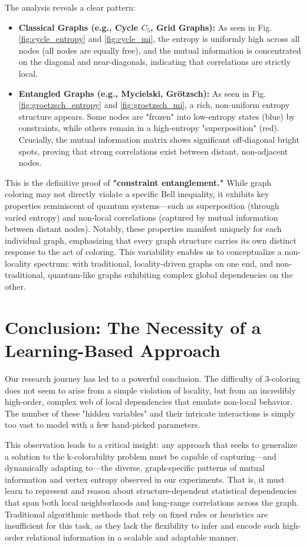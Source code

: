\documentclass[12pt, letterpaper]{article}
\begin{document}
The analysis reveals a clear pattern:
\begin{itemize}
    \item \textbf{Classical Graphs (e.g., Cycle $C_5$, Grid Graphs):} As seen in Fig. \ref{fig:cycle_entropy} and \ref{fig:cycle_mi}, the entropy is uniformly high across all nodes (all nodes are equally free), and the mutual information is concentrated on the diagonal and near-diagonals, indicating that correlations are strictly local.
    \item \textbf{Entangled Graphs (e.g., Mycielski, Grötzsch):} As seen in Fig. \ref{fig:groetzsch_entropy} and \ref{fig:groetzsch_mi}, a rich, non-uniform entropy structure appears. Some nodes are "frozen" into low-entropy states (blue) by constraints, while others remain in a high-entropy "superposition" (red). Crucially, the mutual information matrix shows significant off-diagonal bright spots, proving that strong correlations exist between distant, non-adjacent nodes.
\end{itemize}

This is the definitive proof of \textbf{"constraint entanglement."} While graph coloring may not directly violate a specific Bell inequality, it exhibits key properties reminiscent of quantum systems—such as superposition (through varied entropy) and non-local correlations (captured by mutual information between distant nodes). Notably, these properties manifest uniquely for each individual graph, emphasizing that every graph structure carries its own distinct response to the act of coloring. This variability enables us to conceptualize a non-locality spectrum: with traditional, locality-driven graphs on one end, and non-traditional, quantum-like graphs exhibiting complex global dependencies on the other.

\section{Conclusion: The Necessity of a Learning-Based Approach}
Our research journey has led to a powerful conclusion. The difficulty of 3-coloring does not seem to arise from a simple violation of locality, but from an incredibly high-order, complex web of local dependencies that emulate non-local behavior. The number of these "hidden variables" and their intricate interactions is simply too vast to model with a few hand-picked parameters.

This observation leads to a critical insight: any approach that seeks to generalize a solution to the k-colorability problem must be capable of capturing—and dynamically adapting to—the diverse, graph-specific patterns of mutual information and vertex entropy observed in our experiments. That is, it must learn to represent and reason about structure-dependent statistical dependencies that span both local neighborhoods and long-range correlations across the graph. Traditional algorithmic methods that rely on fixed rules or heuristics are insufficient for this task, as they lack the flexibility to infer and encode such high-order relational information in a scalable and adaptable manner.
\end{document}
